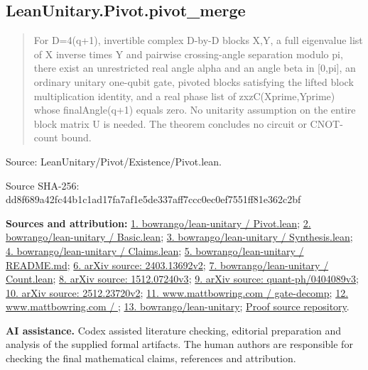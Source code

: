 \documentclass[11pt,a4paper]{article}
\begin{document}
\begin{samepage}
\subsection{LeanUnitary.Pivot.pivot\_merge}
\begin{quote}\small\ttfamily For D=4(q+1), invertible complex D-by-D blocks X,Y, a full eigenvalue list of X inverse times Y and pairwise crossing-angle separation modulo pi, there exist an unrestricted real angle alpha and an angle beta in [0,pi], an ordinary unitary one-qubit gate, pivoted blocks satisfying the lifted block multiplication identity, and a real phase list of zxzC(Xprime,Yprime) whose finalAngle(q+1) equals zero. No unitarity assumption on the entire block matrix U is needed. The theorem concludes no circuit or CNOT-count bound.\end{quote}
{\small Source: LeanUnitary/Pivot/Existence/Pivot.lean.\par}

{\small Source SHA-256: dd8f689a42fc44b1c1ad17fa7af1e5de337aff7ccc0ec0ef7551ff81e362c2bf\par}

{\small\textbf{Sources and attribution:} \href{https://github.com/bowrango/lean-unitary/blob/7014b63ee2cfd01c641a7f539c73b664a2aa3d66/LeanUnitary/Pivot/Existence/Pivot.lean}{1. bowrango/lean-unitary / Pivot.lean}; \href{https://github.com/bowrango/lean-unitary/blob/7014b63ee2cfd01c641a7f539c73b664a2aa3d66/LeanUnitary/Pivot/Multiplexor/Basic.lean}{2. bowrango/lean-unitary / Basic.lean}; \href{https://github.com/bowrango/lean-unitary/blob/7014b63ee2cfd01c641a7f539c73b664a2aa3d66/LeanUnitary/Pivot/Synthesis.lean}{3. bowrango/lean-unitary / Synthesis.lean}; \href{https://github.com/bowrango/lean-unitary/blob/7014b63ee2cfd01c641a7f539c73b664a2aa3d66/LeanUnitary/Claims.lean}{4. bowrango/lean-unitary / Claims.lean}; \href{https://github.com/bowrango/lean-unitary/blob/7014b63ee2cfd01c641a7f539c73b664a2aa3d66/LeanUnitary/README.md}{5. bowrango/lean-unitary / README.md}; \href{https://arxiv.org/abs/2403.13692v2}{6. arXiv source: 2403.13692v2}; \href{https://github.com/bowrango/lean-unitary/blob/7014b63ee2cfd01c641a7f539c73b664a2aa3d66/LeanUnitary/Pivot/Count.lean}{7. bowrango/lean-unitary / Count.lean}; \href{https://arxiv.org/abs/1512.07240v3}{8. arXiv source: 1512.07240v3}; \href{https://arxiv.org/abs/quant-ph/0404089v3}{9. arXiv source: quant-ph/0404089v3}; \href{https://arxiv.org/html/2512.23720v2}{10. arXiv source: 2512.23720v2}; \href{https://www.mattbowring.com/posts/gate-decomp/}{11. www.mattbowring.com / gate-decomp}; \href{https://www.mattbowring.com/}{12. www.mattbowring.com / }; \href{https://github.com/bowrango/lean-unitary/tree/7014b63ee2cfd01c641a7f539c73b664a2aa3d66}{13. bowrango/lean-unitary}; \href{https://github.com/alejandrozu/openmath-2026-judging}{Proof source repository}.\par}

\end{samepage}
{\small \textbf{AI assistance.} Codex assisted literature checking, editorial preparation and analysis of the supplied formal artifacts. The human authors are responsible for checking the final mathematical claims, references and attribution.\par}
\end{document}
